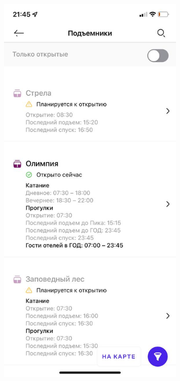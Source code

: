 \begin{figure}[h!]
\begin{center}
		\begin{subfigure}{.33\textwidth}
			\centering
			\includegraphics[width=.95\linewidth]{../imgs/analogue_apps/rlift.png}
			\label{img:rlift}

\end{subfigure}
\end{center}
\end{figure}
